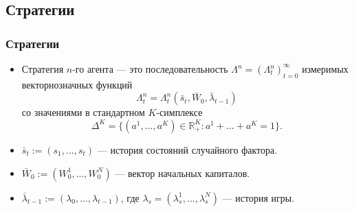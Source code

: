 \documentclass[10pt]{beamer}
\theoremstyle{definition}
\theoremstyle{remark}
\newcommand{\R}{\mathbb{R}}
\begin{document}
\subsection{Стратегии}
\begin{frame}\frametitle{Стратегии}
    \begin{itemize}
    \item Стратегия $n$-го агента — это последовательность $\Lambda^n =
    (\Lambda_t^n)_{t=0}^\infty$ измеримых векторнозначных функций 
    \[
    \Lambda_t^n =\Lambda_t^n(\bar s_{t},\bar W_0 , \bar \lambda_{t-1})
    \]
    со значениями в стандартном $K$-симплексе 
    \[
    \Delta^K
    =\{ (a^1, \dots, a^K) \in \R^K_+ : a^1+\ldots+a^K = 1\}.
    \]

    \item $\bar s_{t} := (s_1,...,s_{t})$ — история состояний случайного фактора.  
    \item $\bar W_0 := (W_0^1,...,W_0^N)$ — вектор начальных капиталов.
    \item $\bar \lambda_{t-1} := ( \lambda_0,..., \lambda_{t-1})$, где $ \lambda_s = (\lambda^1_s, \dots, \lambda^N_s )$ — история игры.
    \end{itemize}

\end{frame}

\end{document}
